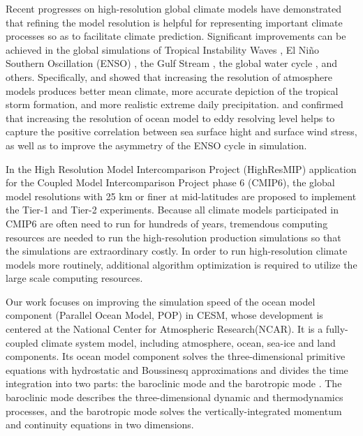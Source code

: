 \introduction  \label{se:int}
Recent progresses on high-resolution global climate models have demonstrated that refining the model resolution is helpful for representing important climate processes so as to facilitate climate prediction. Significant improvements can be achieved in the global simulations of Tropical Instability Waves \citep{roberts2009impact}, El Ni\~no Southern Oscillation (ENSO) \citep{shaffrey2009uk}, the Gulf Stream \citep{chassignet2008gulf, kuwano2010precipitation} , the global water cycle \citep{demory2014role}, and others. Specifically, \cite{gent2010improvements}  and \cite{wehner2014effect} showed that increasing the resolution of atmosphere models produces better mean climate, more accurate depiction of the tropical storm formation, and more realistic extreme daily precipitation.  \cite{bryan2010frontal} and  \cite{graham2014importance} confirmed that increasing the resolution of ocean model to eddy resolving level helps to capture the positive correlation between sea surface hight and surface wind stress, as well as to improve the asymmetry of the ENSO cycle in simulation.

In the High Resolution Model Intercomparison Project (HighResMIP) application for  the Coupled Model Intercomparison Project phase 6 (CMIP6), the global model resolutions with 25 km or finer at mid-latitudes are proposed to implement the Tier-1 and Tier-2 experiments. Because all climate models participated in CMIP6 are often need to run for hundreds of years, tremendous computing resources are needed to run the high-resolution production simulations so that the simulations are extraordinary costly. In order to run high-resolution climate models more routinely, additional algorithm optimization is required to utilize the large scale computing resources.

Our work focuses on improving the simulation speed of the ocean model component (Parallel Ocean Model, POP) in CESM, whose development is centered at the National Center for Atmospheric Research(NCAR). It is a fully-coupled climate system model, including atmosphere, ocean, sea-ice and land components. Its ocean model component solves the three-dimensional primitive equations with hydrostatic and Boussinesq approximations and divides the time integration into two parts: the baroclinic mode and the barotropic mode  \citep{smith2010parallel}. The baroclinic mode describes the three-dimensional dynamic and thermodynamics processes, and the barotropic mode solves the vertically-integrated momentum and continuity equations in two dimensions.




